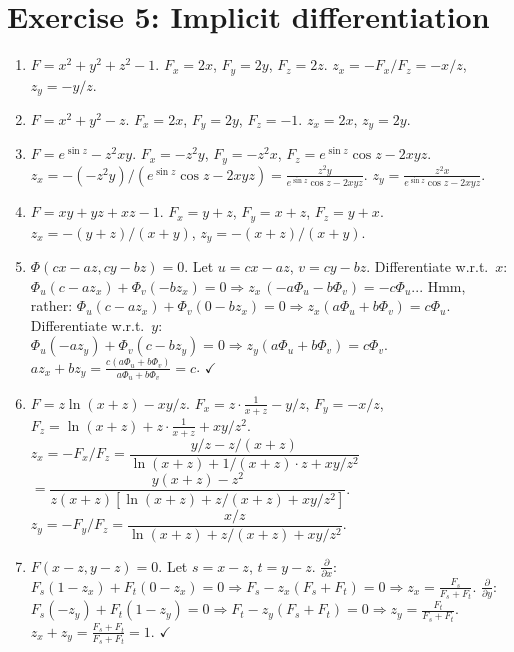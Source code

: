 \documentclass[12pt,a4paper]{article}
\begin{document}
\section*{Exercise 5: Implicit differentiation}

\begin{enumerate}[leftmargin=*, label=(\alph*)]

\item $F=x^2+y^2+z^2-1$. $F_x=2x$, $F_y=2y$, $F_z=2z$.
$z_x=-F_x/F_z=-x/z$, $z_y=-y/z$.

\item $F=x^2+y^2-z$. $F_x=2x$, $F_y=2y$, $F_z=-1$.
$z_x=2x$, $z_y=2y$.

\item $F=e^{\sin z}-z^2 xy$. $F_x=-z^2 y$, $F_y=-z^2 x$, $F_z=e^{\sin z}\cos z-2xyz$.
$z_x=-(-z^2y)/(e^{\sin z}\cos z-2xyz)=\frac{z^2 y}{e^{\sin z}\cos z-2xyz}$.
$z_y=\frac{z^2 x}{e^{\sin z}\cos z-2xyz}$.

\item $F=xy+yz+xz-1$. $F_x=y+z$, $F_y=x+z$, $F_z=y+x$.
$z_x=-(y+z)/(x+y)$, $z_y=-(x+z)/(x+y)$.

\item $\Phi(cx-az,cy-bz)=0$. Let $u=cx-az$, $v=cy-bz$.
Differentiate w.r.t.\ $x$: $\Phi_u(c-az_x)+\Phi_v(-bz_x)=0\Rightarrow z_x\,(-a\Phi_u-b\Phi_v)=-c\Phi_u$...
Hmm, rather: $\Phi_u(c-az_x)+\Phi_v(0-bz_x)=0\Rightarrow z_x(a\Phi_u+b\Phi_v)=c\Phi_u$.
Differentiate w.r.t.\ $y$: $\Phi_u(-az_y)+\Phi_v(c-bz_y)=0\Rightarrow z_y(a\Phi_u+b\Phi_v)=c\Phi_v$.
$az_x+bz_y=\frac{c(a\Phi_u+b\Phi_v)}{a\Phi_u+b\Phi_v}=c$. $\checkmark$

\item $F=z\ln(x+z)-xy/z$. $F_x=z\cdot\frac{1}{x+z}-y/z$, $F_y=-x/z$,
$F_z=\ln(x+z)+z\cdot\frac{1}{x+z}+xy/z^2$.
$z_x=-F_x/F_z=\dfrac{y/z-z/(x+z)}{\ln(x+z)+1/(x+z)\cdot z+xy/z^2}$
$=\dfrac{y(x+z)-z^2}{z(x+z)\left[\ln(x+z)+z/(x+z)+xy/z^2\right]}$.
$z_y=-F_y/F_z=\dfrac{x/z}{\ln(x+z)+z/(x+z)+xy/z^2}$.

\item $F(x-z,y-z)=0$. Let $s=x-z$, $t=y-z$.
$\frac{\partial}{\partial x}$: $F_s(1-z_x)+F_t(0-z_x)=0\Rightarrow F_s-z_x(F_s+F_t)=0\Rightarrow z_x=\frac{F_s}{F_s+F_t}$.
$\frac{\partial}{\partial y}$: $F_s(-z_y)+F_t(1-z_y)=0\Rightarrow F_t-z_y(F_s+F_t)=0\Rightarrow z_y=\frac{F_t}{F_s+F_t}$.
$z_x+z_y=\frac{F_s+F_t}{F_s+F_t}=1$. $\checkmark$

\end{enumerate}
\end{document}
